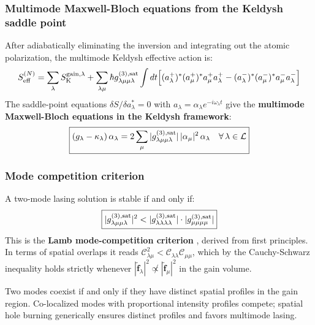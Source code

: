 \documentclass[12pt]{article}
\newcommand{\Keldysh}{{\rm K}}
\newcommand{\tf}{\tilde{\mathbf{f}}}
\begin{document}
\subsubsection*{Multimode Maxwell-Bloch equations from the Keldysh saddle point}

After adiabatically eliminating the inversion and integrating out the
atomic polarization, the multimode Keldysh effective action is:
\begin{equation}
  S_{\rm eff}^{(N)} =
  \sum_\lambda S_\Keldysh^{\rm gain,\lambda}
  + \sum_{\lambda\mu}
  \hbar g^{(3),\rm sat}_{\lambda\mu\mu\lambda}
  \int dt\Bigl[
  (a_\lambda^+)^*(a_\mu^+)^*a_\mu^+a_\lambda^+
  -(a_\lambda^-)^*(a_\mu^-)^*a_\mu^-a_\lambda^-\Bigr]
  \label{eq:multimode_action}
\end{equation}
The saddle-point equations $\delta S/\delta a_\lambda^* = 0$
with $a_\lambda = \alpha_\lambda e^{-i\omega_\lambda t}$ give the
\textbf{multimode Maxwell-Bloch equations in the Keldysh framework}:
\begin{equation}
  \boxed{
  (g_\lambda - \kappa_\lambda)\,\alpha_\lambda
  = 2\sum_\mu
  |g^{(3),\rm sat}_{\lambda\mu\mu\lambda}|\,
  |\alpha_\mu|^2\,\alpha_\lambda
  \quad\forall\,\lambda\in\mathcal{L}
  }
  \label{eq:multimode_MF}
\end{equation}

\subsubsection*{Mode competition criterion}

A two-mode lasing solution is stable if and only if:
\begin{equation}
  \boxed{
  |g^{(3),\rm sat}_{\lambda\mu\mu\lambda}|^2
  <
  |g^{(3),\rm sat}_{\lambda\lambda\lambda\lambda}|\cdot
  |g^{(3),\rm sat}_{\mu\mu\mu\mu}|
  }
  \label{eq:coexistence}
\end{equation}
This is the \textbf{Lamb mode-competition criterion} \cite{Lamb1964},
derived from first principles.  In terms of spatial overlaps it reads
$\mathcal{C}_{\lambda\mu}^2 < \mathcal{C}_{\lambda\lambda}\mathcal{C}_{\mu\mu}$,
which by the Cauchy-Schwarz inequality holds strictly whenever
$|\tf_\lambda|^2 \not\propto |\tf_\mu|^2$ in the gain volume.
\begin{remark}
Two modes coexist if and only if they have distinct spatial profiles in
the gain region.  Co-localized modes with proportional intensity profiles
compete; spatial hole burning generically ensures distinct profiles and
favors multimode lasing.
\end{remark}
\end{document}
